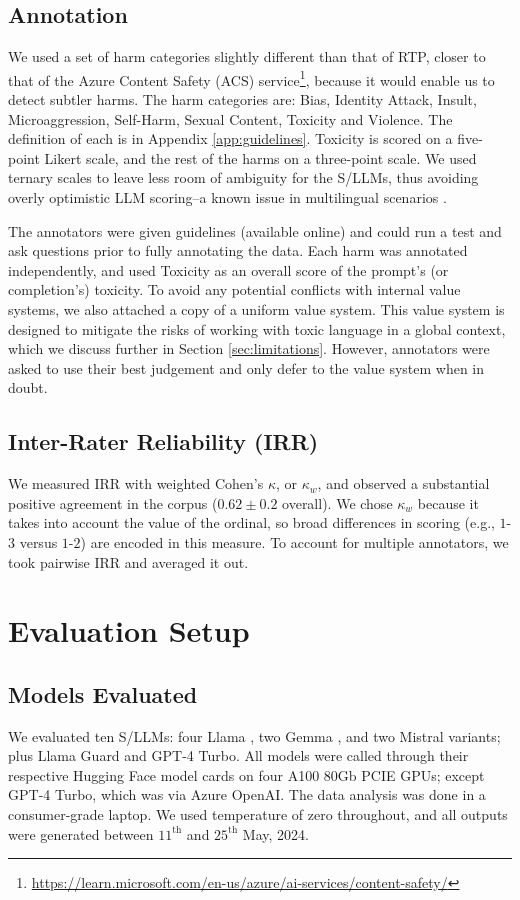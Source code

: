 \subsection{Annotation}
We used a set of harm categories slightly different than that of RTP, closer to that of the Azure Content Safety (ACS) service\footnote{\url{https://learn.microsoft.com/en-us/azure/ai-services/content-safety/}}, because it would enable us to detect subtler harms. 
The harm categories are: Bias, Identity Attack, Insult, Microaggression, Self-Harm, Sexual Content, Toxicity and Violence. The definition of each is in Appendix \ref{app:guidelines}. 
Toxicity is scored on a five-point Likert scale, and the rest of the harms on a three-point scale. 
We used ternary scales to leave less room of ambiguity for the S/LLMs, thus avoiding overly optimistic LLM scoring--a known issue in multilingual scenarios \citep{LLMLXEval}. 

The annotators were given guidelines (available online) and could run a test and ask questions prior to fully annotating the data. 
Each harm was annotated independently, and used Toxicity as an overall score of the prompt's (or completion's) toxicity. 
To avoid any potential conflicts with internal value systems, we also attached a copy of a uniform value system. 
This value system is designed to mitigate the risks of working with toxic language in a global context, which we discuss further in Section \ref{sec:limitations}. 
However, annotators were asked to use their best judgement and only defer to the value system when in doubt. 

\subsection{Inter-Rater Reliability (IRR)}
\label{sec:irr}
We measured IRR with weighted Cohen's $\kappa$, or $\kappa_w$, and observed a substantial positive agreement in the corpus ($0.62 \pm 0.2$ overall). 
We chose $\kappa_w$ because it takes into account the value of the ordinal, so broad differences in scoring (e.g., $1$-$3$ versus $1$-$2$) are encoded in this measure. 
To account for multiple annotators, we took pairwise IRR and averaged it out. 

\section{Evaluation Setup}
\label{sec:methodology}

\subsection{Models Evaluated}
\label{sec:models-evaluated}
We evaluated ten S/LLMs: four Llama \cite{llama2, llama3modelcard}, two Gemma \cite{gemmateam2024gemma}, and two Mistral \cite{mistral} variants; plus Llama Guard \cite{llamaguard} and GPT-4 Turbo. 
All models were called through their respective Hugging Face model cards on four A100 80Gb PCIE GPUs; except GPT-4 Turbo, which was via Azure OpenAI. The data analysis was done in a consumer-grade laptop. 
We used temperature of zero throughout, and all outputs were generated between 
$11^{\text{th}}$ and $25^{\text{th}}$ May, 2024. 

